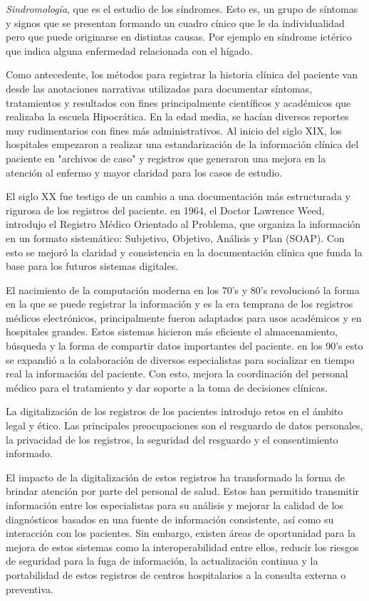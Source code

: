     \textit{Sindromología}, que es el estudio de los síndromes. Esto es, un grupo de síntomas y signos que se presentan formando un cuadro cínico que le da individualidad pero que puede originarse en distintas causas. Por ejemplo en síndrome ictérico que indica alguna enfermedad relacionada con el hígado.

   Como antecedente, los métodos para registrar la historia clínica del paciente van desde las anotaciones narrativas utilizadas para documentar síntomas, tratamientos y resultados con fines principalmente científicos y académicos que realizaba la escuela Hipocrática. En la edad media, se hacían diversos reportes muy rudimentarios con fines más administrativos. Al inicio del siglo XIX, los hospitales empezaron a realizar una estandarización de la información clínica del paciente en "archivos de caso" y registros que generaron una mejora en la atención al enfermo y mayor claridad para los casos de estudio.

    El siglo XX fue testigo de un cambio a una documentación más estructurada y rigurosa de los registros del paciente. en 1964, el Doctor Lawrence Weed, introdujo el Registro Médico Orientado al Problema, que organiza la información en un formato sistemático: Subjetivo, Objetivo, Análisis y Plan (SOAP). Con esto se mejoró la claridad y consistencia en la documentación clínica que funda la base para los futuros sistemas digitales.

    El nacimiento de la computación moderna en los 70's y 80's revolucionó la forma en la que se puede registrar la información y es la era temprana de los registros médicos electrónicos, principalmente fueron adaptados para usos académicos y en hospitales grandes. Estos sistemas hicieron más eficiente el almacenamiento, búsqueda y la forma de compartir datos importantes del paciente. en los 90's esto se expandió a la colaboración de diversos especialistas para socializar en tiempo real la información del paciente. Con esto, mejora la coordinación del personal médico para el tratamiento y dar soporte a la toma de decisiones clínicas.

    La digitalización de los registros de los pacientes introdujo retos en el ámbito legal y ético. Las principales preocupaciones son el resguardo de datos personales, la privacidad de los registros, la seguridad del resguardo y el consentimiento informado.

    El impacto de la digitalización de estos registros ha transformado la forma de brindar atención por parte del personal de salud. Estos han permitido transmitir información entre los especialistas para su análisis y mejorar la calidad de los diagnósticos basados en una fuente de información consistente, así como su interacción con los pacientes. Sin embargo, existen áreas de oportunidad para la mejora de estos sistemas como la interoperabilidad entre ellos, reducir los riesgos de seguridad para la fuga de información, la actualización continua y la portabilidad de estos registros de centros hospitalarios a la consulta externa o preventiva.

